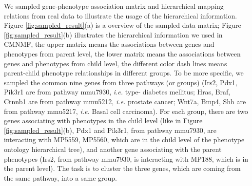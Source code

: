 \documentclass{bmcart}
\begin{document}
 We sampled gene-phenotype association matrix and hierarchical mapping relations from real data to illustrate the usage of the hierarchical information. Figure \ref{fig:sampled_result}(a) is a overview of the sampled data matrix; Figure \ref{fig:sampled_result}(b) illustrates the hierarchical information we used in CMNMF, the upper matrix means the associations between genes and phenotypes from parent level, the lower matrix means the associations between genes and phenotypes from child level, the different color dash lines means parent-child phenotype relationships in different groups.
To be more specific, we sampled the common nine genes from three pathways (or groups) (Irs2, Pdx1, Pik3r1 are from pathway mmu7930, \emph{i.e.} type-\uppercase\expandafter{} diabetes mellitus; Hras, Braf, Ctnnb1 are from pathway mmu5212, \emph{i.e.} prostate cancer; Wnt7a, Bmp4, Shh are from pathway mmu5217, \emph{i.e.} Basal cell carcinoma). For each group, there are two genes associating with phenotypes in the child level (like in Figure \ref{fig:sampled_result}(b), Pdx1 and Pik3r1, from pathway mmu7930, are interacting with MP5559, MP5560, which are in the child level of the phenotype ontology hierarchical tree), and another gene associating with the parent phenotypes (Irs2, from pathway mmu7930, is interacting with MP188, which is in the parent level). The task is to cluster the three genes, which are coming from the same pathway, into a same group.
\end{document}
